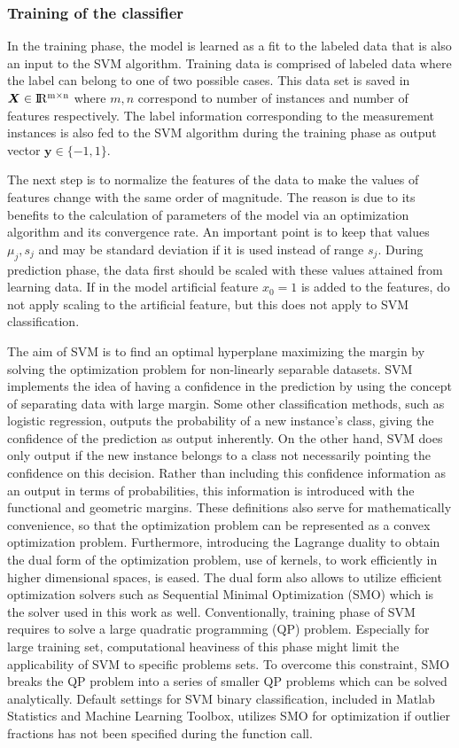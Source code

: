 \subsubsection{Training of the classifier}
In the training phase, the model is learned as a fit to the labeled data that is also an input to the SVM algorithm. 
Training data is comprised of labeled data where the label can belong to one of two possible cases. 
This data set is saved in $\bm{X} \in {\rm I\!R^{m \times n}}  $ where $m,n$ correspond to number of instances and number of features respectively. 
The label information corresponding to the measurement instances is also fed to the SVM algorithm during the training phase as output vector $\bm{y} \in \{-1,1\}$. 

The next step is to normalize the features of the data to make the values of features change with the same order of magnitude. 
The reason is due to its benefits to the calculation of parameters of the model via an optimization algorithm and its convergence rate.  
An important point is to keep that values $\mu_j, s_j$ and may be standard deviation if it is used instead of range $s_j$. 
During prediction phase, the data first should be scaled with these values attained from learning data.
If in the model artificial feature  $x_0 = 1$ is added to the features, do not apply scaling to the artificial feature, but this does not apply to SVM classification.

The aim of SVM is to find an optimal hyperplane maximizing the margin by solving the optimization problem for non-linearly separable datasets. 
SVM implements the idea of having a confidence in the prediction by using the concept of separating data with large margin. 
Some other classification methods, such as logistic regression, outputs the probability of a new instance's class, giving the confidence of the prediction as output inherently. 
On the other hand, SVM does only output if the new instance belongs to a class not necessarily pointing the confidence on this decision. 
Rather than including this confidence information as an output in terms of probabilities, this information is introduced with the functional and geometric margins. 
These definitions also serve for mathematically convenience, so that the optimization problem can be represented as a convex optimization problem.
Furthermore, introducing the Lagrange duality to obtain the dual form of the optimization problem, use of kernels, to work efficiently in higher dimensional spaces, is eased. 
The dual form also allows to utilize efficient optimization solvers such as Sequential Minimal Optimization (SMO)  \cite{platt1998sequential} which is the solver used in this work as well. Conventionally, training phase of SVM requires to solve a large quadratic programming (QP) problem. Especially for large training set, computational heaviness of this phase might limit the applicability of SVM to specific problems sets. To overcome this constraint, SMO breaks the QP problem into a series of smaller QP problems which can be solved analytically. Default settings for SVM binary classification, included in Matlab Statistics and Machine Learning Toolbox, utilizes SMO for optimization if outlier fractions has not been specified during the function call. 

